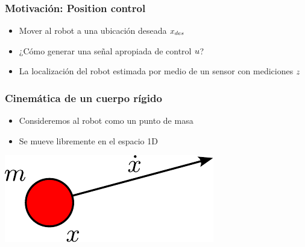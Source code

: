 \begin{frame}
    \frametitle{Motivación: Position control}
    
    \begin{itemize}
        \item Mover al robot a una ubicación deseada $x_{des}$
        \item ¿Cómo generar una señal apropiada de control $u$?
        \item La localización del robot estimada por medio de un sensor con mediciones $z$
    \end{itemize}
    
\end{frame}


\begin{frame}
    \frametitle{Cinemática de un cuerpo rígido}
    
    \begin{itemize}
        \item Consideremos al robot como un punto de masa
        \item Se mueve libremente en el espacio 1D
    \end{itemize}
    
    
    \begin{center}
        \includegraphics[width=0.4\columnwidth]{images/rigid_body_kinematics.pdf}
    \end{center}
    
\end{frame}

